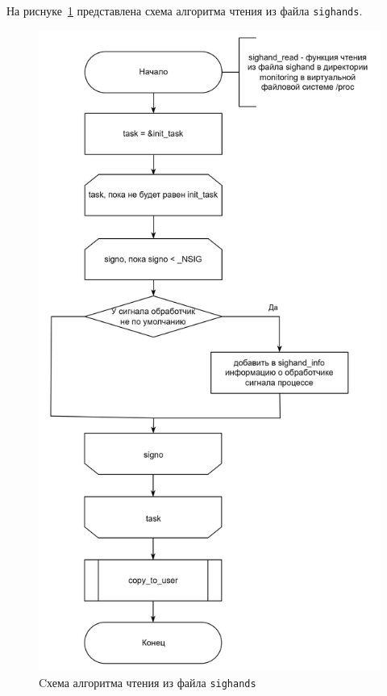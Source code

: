 На риснуке~\ref{img:alg:sighand} представлена схема алгоритма чтения из файла \texttt{sighands}.

\begin{figure}[h]
	\centering
	\includegraphics[height=0.7\textheight]{img/alg-sighand.png}
	\caption{Cхема алгоритма чтения из файла \texttt{sighands}}
	\label{img:alg:sighand}
\end{figure}

